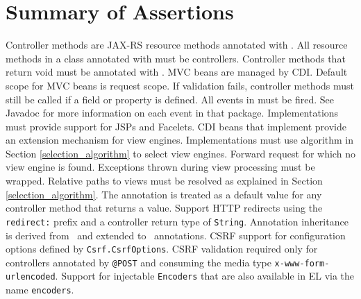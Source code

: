 \chapter{Summary of Assertions}
\label{assertions}

\begin{description}
 Controller methods are JAX-RS resource methods annotated with .
 All resource methods in a class annotated with  must
be controllers.
 Controller methods that return void must be annotated with .
 MVC beans are managed by CDI.
 Default scope for MVC beans is request scope.
 If validation fails, controller methods must still be called if a 
 field or property is defined. 
 All events in  must be fired. See Javadoc for more
information on each event in that package.
 Implementations must provide support for JSPs and Facelets.
 CDI beans that implement  provide
an extension mechanism for view engines.
 Implementations must use algorithm in Section \ref{selection_algorithm} 
to select view engines.
 Forward request for which no view engine is found.
 Exceptions thrown during view processing must be wrapped.
 Relative paths to views must be resolved as explained in 
Section \ref{selection_algorithm}.
 The  annotation is treated as a default value for any controller 
method that returns a  value.
 Support HTTP redirects using the {\tt redirect:} prefix and a controller
return type of {\tt String}.
 Annotation inheritance is derived from \jaxrs\  and extended to 
\mvc\ annotations. 
 CSRF support for configuration options defined by {\tt Csrf.CsrfOptions}.
 CSRF validation required only for controllers annotated by {\tt @POST} 
and consuming the media type {\tt x-www-form-urlencoded}.
 Support for injectable {\tt Encoders} that are also available in EL via the
name {\tt encoders}.
\end{description}
